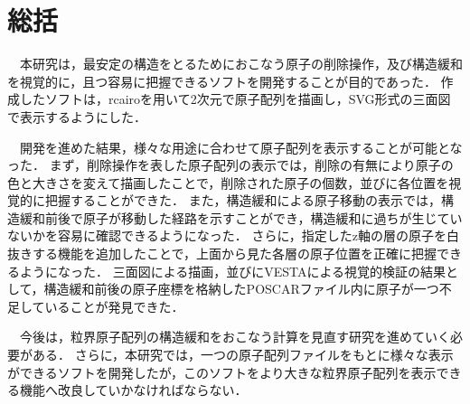 \section{総括}
　本研究は，最安定の構造をとるためにおこなう原子の削除操作，及び構造緩和を視覚的に，且つ容易に把握できるソフトを開発することが目的であった．
作成したソフトは，rcairoを用いて2次元で原子配列を描画し，SVG形式の三面図で表示するようにした．

　開発を進めた結果，様々な用途に合わせて原子配列を表示することが可能となった．
まず，削除操作を表した原子配列の表示では，削除の有無により原子の色と大きさを変えて描画したことで，削除された原子の個数，並びに各位置を視覚的に把握することができた．
また，構造緩和による原子移動の表示では，構造緩和前後で原子が移動した経路を示すことができ，構造緩和に過ちが生じていないかを容易に確認できるようになった．
さらに，指定したz軸の層の原子を白抜きする機能を追加したことで，上面から見た各層の原子位置を正確に把握できるようになった．
三面図による描画，並びにVESTAによる視覚的検証の結果として，構造緩和前後の原子座標を格納したPOSCARファイル内に原子が一つ不足していることが発見できた．

　今後は，粒界原子配列の構造緩和をおこなう計算を見直す研究を進めていく必要がある．
さらに，本研究では，一つの原子配列ファイルをもとに様々な表示ができるソフトを開発したが，このソフトをより大きな粒界原子配列を表示できる機能へ改良していかなければならない．

